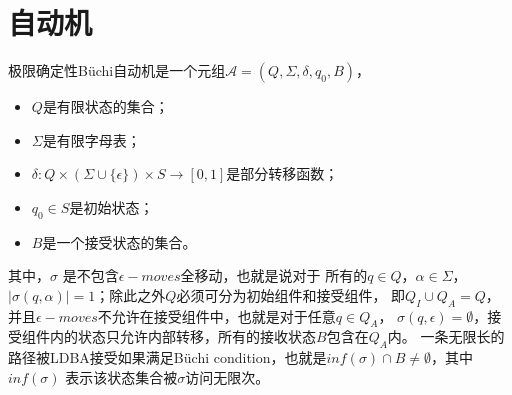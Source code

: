 \section{自动机}

\begin{definition}
极限确定性Büchi自动机是一个元组$\mathcal{A} =(Q,\Sigma ,\delta ,q_0,B) $，
\begin{itemize}
    \item $Q$是有限状态的集合；
    \item $\Sigma$是有限字母表；
    \item $\delta:Q\times (\Sigma \cup \{\epsilon\})\times S \rightarrow [0,1]$是部分转移函数；
    \item $q_0 \in S$是初始状态；
    \item $B$是一个接受状态的集合。
\end{itemize}
其中，$\sigma$ 是不包含$\epsilon - moves$全移动，也就是说对于
所有的$q\in Q$，$\alpha \in \Sigma$，$|\sigma(q,\alpha)| = 1$；除此之外$Q$必须可分为初始组件和接受组件，
即$Q_I \cup Q_A=Q$，并且$\epsilon - moves$不允许在接受组件中，也就是对于任意$q \in Q_A$，
$\sigma(q,\epsilon) = \emptyset$，接受组件内的状态只允许内部转移，所有的接收状态$B$包含在$Q_A$内。
一条无限长的路径被LDBA接受如果满足Büchi condition，也就是$inf(\sigma) \cap B \neq \emptyset $，其中
$inf(\sigma)$ 表示该状态集合被$\sigma$访问无限次。
\end{definition}

